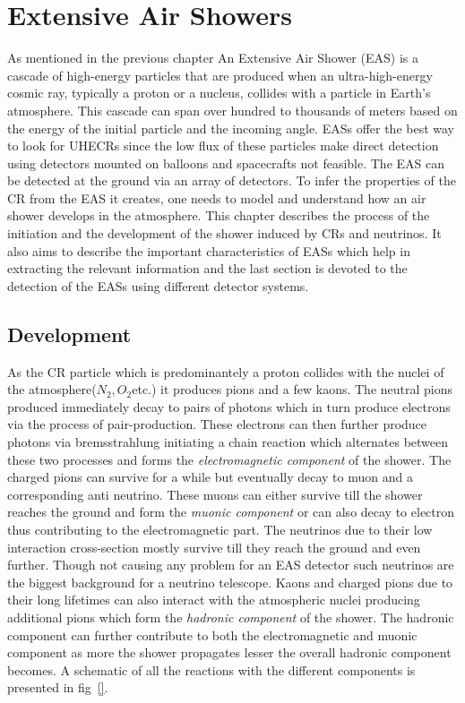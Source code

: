 
\chapter{Extensive Air Showers}
\label{sec:EAS}

As mentioned in the previous chapter An Extensive Air Shower (EAS) is a cascade of high-energy particles that are produced when an ultra-high-energy cosmic ray, typically a proton or a nucleus, collides with a particle in Earth's atmosphere. This cascade can span over hundred to thousands of meters based on the energy of the initial particle and the incoming angle. EASs offer the best way to look for UHECRs since the low flux of these particles make direct detection using detectors mounted on balloons and spacecrafts not feasible. The EAS can be detected at the ground via an array of detectors. To infer the properties of the CR from the EAS it creates, one needs to model and understand how an air shower develops in the atmosphere. This chapter describes the process of the initiation and the development of the shower induced by CRs and neutrinos. It also aims to describe the important characteristics of EASs which help in extracting the relevant information and the last section is devoted to the detection of the EASs using different detector systems. 

\section{Development}
\label{sec:EAS_dev}
As the CR particle which is predominantely a proton collides with the nuclei of the atmosphere($N_2, O_2 $etc.) it produces pions and a few kaons. The neutral pions produced immediately decay to pairs of photons which in turn produce electrons via the process of pair-production. These electrons can then further produce photons via bremsstrahlung initiating a chain reaction which alternates between these two processes and forms the \textit{electromagnetic component} of the shower. The charged pions can survive for a while but eventually decay to muon and a corresponding anti neutrino. These muons can either survive till the shower reaches the ground and form the \textit{muonic component} or can also decay to electron thus contributing to the electromagnetic part. The neutrinos due to their low interaction cross-section mostly survive till they reach the ground and even further. Though not causing any problem for an EAS detector such neutrinos are the biggest background for a neutrino telescope. Kaons and charged pions due to their long lifetimes can also interact with the atmospheric nuclei producing additional pions which form the \textit{hadronic component} of the shower. The hadronic component can further contribute to both the electromagnetic and muonic component as more the shower propagates lesser the overall hadronic component becomes. A schematic of all the reactions with the different components is presented in fig~\ref{}.

